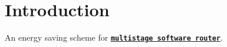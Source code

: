\hypertarget{index_intro}{}\section{Introduction}\label{index_intro}
An energy saving scheme for \href{multistage_software_router.pdf}{\tt {\bfseries multistage software router}}. 